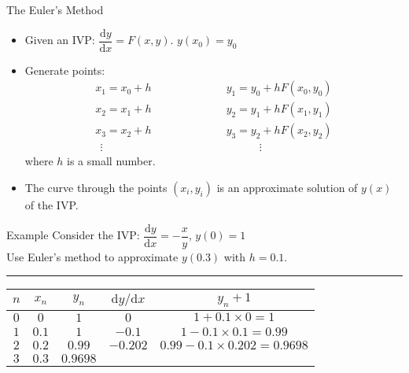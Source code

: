 \documentclass[12pt,a4paper]{article}
\def\d{{\mathrm{d}}}
\begin{document}
\begin{thm}{The Euler's Method}
	\begin{itemize}
		\item Given an IVP: $\dfrac{\d y}{\d x}=F(x,y)$. $y(x_0)=y_0$
		\item Generate points: 
		$$\begin{aligned}
			x_1=x_0+h\quad\qquad&\quad\qquad y_1=y_0+hF(x_0,y_0)\\
			x_2=x_1+h\quad\qquad&\quad\qquad y_2=y_1+hF(x_1,y_1)\\
			x_3=x_2+h\quad\qquad&\quad\qquad y_3=y_2+hF(x_2,y_2)\\
			\ \ \vdots\quad\qquad\qquad&\qquad\qquad\qquad\vdots
		\end{aligned}$$
		where $h$ is a small number. 
		\item The curve through the points $(x_i,y_i)$ is an approximate solution of $y(x)$ of the IVP. 
	\end{itemize}
\end{thm}
\begin{eg}{Example}
	Consider the IVP: $\dfrac{\d y}{\d x}=-\dfrac{x}{y}$, $y(0)=1$\\
	Use Euler's method to approximate $y(0.3)$ with $h=0.1$.\\
	\noindent\rule[0.25\baselineskip]{\textwidth}{1pt}
	\begin{center}
		\begin{tabular}{c|c|c|c|c}
		$n$ & $x_n$ & $y_n$ & $\d y/\d x$ & $y_n+1$ \\ \hline
		$0$ & $0$ & $1$ & $0$ & $1+0.1\times0=1$ \\
		$1$ & $0.1$ & $1$ & $-0.1$ & $1-0.1\times 0.1=0.99$ \\
		$2$ & $0.2$ & $0.99$ & $-0.202$ & $0.99-0.1\times0.202=0.9698$ \\
		$3$ & $0.3$ & $0.9698$ & $\quad$  & $\quad$
		\end{tabular}
	\end{center}
\end{eg}
\end{document}
